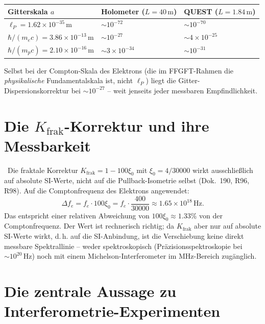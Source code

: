 \KM

\begin{center}
\begin{tabular}{lll}
\toprule
Gitterskala $a$ & Holometer ($L=40\,\text{m}$) & QUEST ($L=1.84\,\text{m}$) \\
\midrule
$\ell_P = 1.62\times10^{-35}\,\text{m}$ & $\sim 10^{-72}$ & $\sim 10^{-70}$ \\
$\hbar/(m_e c) = 3.86\times10^{-13}\,\text{m}$ & $\sim 10^{-27}$ & $\sim 4\times10^{-25}$ \\
$\hbar/(m_p c) = 2.10\times10^{-16}\,\text{m}$ & $\sim 3\times10^{-34}$ & $\sim 10^{-31}$ \\
\bottomrule
\end{tabular}
\end{center}

Selbst bei der Compton-Skala des Elektrons (die im FFGFT-Rahmen die
\emph{physikalische} Fundamentalskala ist, nicht $\ell_P$) liegt die
Gitter-Dispersionskorrektur bei $\sim10^{-27}$ -- weit jenseits jeder
messbaren Empfindlichkeit.

\section{Die $K_\text{frak}$-Korrektur und ihre Messbarkeit}

\KM\ Die fraktale Korrektur $K_\text{frak} = 1 - 100\xi_0$ mit $\xi_0 = 4/30000$
wirkt ausschließlich auf absolute SI-Werte, nicht auf die
Pullback-Isometrie selbst (Dok.~190, R96, R98). Auf die Comptonfrequenz
des Elektrons angewendet:
\begin{equation}
\Delta f_e = f_e \cdot 100\xi_0 = f_e \cdot \frac{400}{30000}
\approx 1.65\times10^{18}\,\text{Hz}.
\end{equation}
Das entspricht einer relativen Abweichung von $100\xi_0 \approx 1.33\%$
von der Comptonfrequenz. Der Wert ist rechnerisch richtig; da $K_\text{frak}$ aber nur auf absolute
SI-Werte wirkt, d.\,h. auf die SI-Anbindung, ist die Verschiebung keine
direkt messbare Spektrallinie -- weder spektroskopisch (Präzisionsspektroskopie
bei $\sim10^{20}\,\text{Hz}$) noch mit einem Michelson-Interferometer im
MHz-Bereich zugänglich.

\section{Die zentrale Aussage zu Interferometrie-Experimenten}

